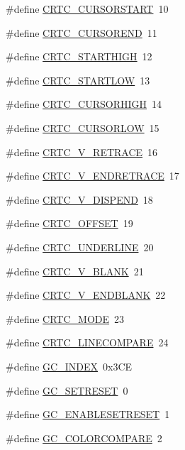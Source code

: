 \begin{DoxyCompactItemize}
\item 
\#define \hyperlink{ID__VL_8H_a5d8414acf33c0e4d1372beb5213f3334}{CRTC\_\-CURSORSTART}~10
\item 
\#define \hyperlink{ID__VL_8H_a3242a088b0e56614f243e26e62a036c6}{CRTC\_\-CURSOREND}~11
\item 
\#define \hyperlink{ID__VL_8H_ae5cf1c711616a97d8fc392a68ad8b3af}{CRTC\_\-STARTHIGH}~12
\item 
\#define \hyperlink{ID__VL_8H_ae0d28f69958070268c2f107f73f24288}{CRTC\_\-STARTLOW}~13
\item 
\#define \hyperlink{ID__VL_8H_a4cfd101b7dcad8991770a20e0eae7ea9}{CRTC\_\-CURSORHIGH}~14
\item 
\#define \hyperlink{ID__VL_8H_a6e391c372e469be85301a7e2d25acbec}{CRTC\_\-CURSORLOW}~15
\item 
\#define \hyperlink{ID__VL_8H_a362bc21eca1b77a712095b3210e6717c}{CRTC\_\-V\_\-RETRACE}~16
\item 
\#define \hyperlink{ID__VL_8H_ae42b2311570995edc5f9cdaaaea06887}{CRTC\_\-V\_\-ENDRETRACE}~17
\item 
\#define \hyperlink{ID__VL_8H_ab26a6adb3929a67e5a5bb3fe4b3a0303}{CRTC\_\-V\_\-DISPEND}~18
\item 
\#define \hyperlink{ID__VL_8H_a08319a5eaf35b44dbada9d97d8918e9e}{CRTC\_\-OFFSET}~19
\item 
\#define \hyperlink{ID__VL_8H_acee24c6f9858c6e775a529aa54e72ea0}{CRTC\_\-UNDERLINE}~20
\item 
\#define \hyperlink{ID__VL_8H_a3444093a484a202dedae57227be767ba}{CRTC\_\-V\_\-BLANK}~21
\item 
\#define \hyperlink{ID__VL_8H_ab7b77d45a13f1c53ace8568736036f3a}{CRTC\_\-V\_\-ENDBLANK}~22
\item 
\#define \hyperlink{ID__VL_8H_a95c43ed0a0f3a79f40585a8e28779a19}{CRTC\_\-MODE}~23
\item 
\#define \hyperlink{ID__VL_8H_adfc84ad2fe77c6c64e34d48ba87661f7}{CRTC\_\-LINECOMPARE}~24
\item 
\#define \hyperlink{ID__VL_8H_a376104a1140e2eb1682b8e6bfbc6baa5}{GC\_\-INDEX}~0x3CE
\item 
\#define \hyperlink{ID__VL_8H_a178dd2b3dcf605e3533114bc61be3278}{GC\_\-SETRESET}~0
\item 
\#define \hyperlink{ID__VL_8H_acf8e550fafef392a58027d11b6280e95}{GC\_\-ENABLESETRESET}~1
\item 
\#define \hyperlink{ID__VL_8H_aa31011edaaba29f1a54020b2150f7935}{GC\_\-COLORCOMPARE}~2
\item 

\end{DoxyCompactItemize}
